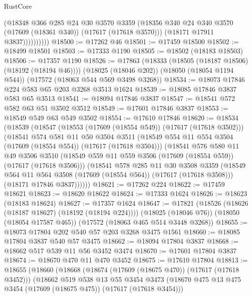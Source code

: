 \begin{lexlean}{RustCore}
\begin{coremodule}
                    (@18348
                      @366
                      @285
                      @24
                      @30
                      @3570
                      @3359
                      (@18356 @340 @24 @340 @3570 (@17609 (@18361 @340)) (@17617 (@17618 @3570)))
                      (@18171 @17911 @3837))))))))))
@18500 := @17262 @46
@18501 := @17459 @18500
@18502 := @18499 @18501
@18503 := @17333 @1190
@18505 := @18502 (@18183 @18503)
@18506 := @17357 @1190
@18526 := @17863
    (@18333 (@18505 (@18187 @18506) (@18192 (@18194 @46))))
    (@18025 (@18046 @202))
    (@18050 (@18054 @1194 @544))
    (@17572 (@18063 @544 @569 @3498 @3268))
@18534 := @18073 @17846 @224 @583 @65 @203 @3268 @3513 @1624
@18539 := @18085 @17846 @3837 @583 @65 @3513
@18541 := @18094 @17846 @3837
@18547 := @18541 @572 @582 @63 @51 @3502 @3512
@18549 := @17601 @17846 @3837
@18553 := @18549 @549 @63 @549 @3502
@18554 := @17610 @17846
@18620 := @18534
    (@18539
      (@18547
        (@18553 (@17609 (@18554 @549)) (@17617 (@17618 @3502)))
        (@18541
          @574
          @581
          @11
          @50
          @3504
          @3511
          (@18549 @554 @11 @554 @3504 (@17609 (@18554 @554)) (@17617 (@17618 @3504)))
          (@18541
            @576
            @580
            @11
            @49
            @3506
            @3510
            (@18549 @559 @11 @559 @3506 (@17609 (@18554 @559)) (@17617 (@17618 @3506)))
            (@18541
              @578
              @285
              @11
              @30
              @3508
              @3359
              (@18549 @564 @11 @564 @3508 (@17609 (@18554 @564)) (@17617 (@17618 @3508)))
              (@18171 @17846 @3837))))))
@18621 := @17262 @224
@18622 := @17459 @18621
@18623 := @18620 @18622
@18624 := @17333 @1624
@18626 := @18623 (@18183 @18624)
@18627 := @17357 @1624
@18647 := @17821
    (@18526 (@18626 (@18187 @18627) (@18192 (@18194 @224))))
    (@18025 (@18046 @76))
    (@18050 (@18054 @17587 @465))
    (@17572 (@18063 @465 @514 @3448 @3268))
@18655 := @18073 @17804 @202 @540 @57 @203 @3268 @3475 @1561
@18660 := @18085 @17804 @3837 @540 @57 @3475
@18662 := @18094 @17804 @3837
@18668 := @18662 @517 @539 @11 @56 @3452 @3474
@18670 := @17601 @17804 @3837
@18674 := @18670 @470 @11 @470 @3452
@18675 := @17610 @17804
@18813 := @18655
    (@18660
      (@18668
        (@18674 (@17609 (@18675 @470)) (@17617 (@17618 @3452)))
        (@18662
          @519
          @538
          @13
          @55
          @3454
          @3473
          (@18670 @475 @13 @475 @3454 (@17609 (@18675 @475)) (@17617 (@17618 @3454)))

\end{coremodule}
\end{lexlean}
